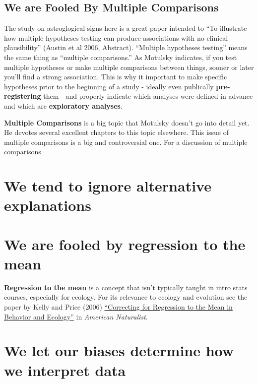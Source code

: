 \documentclass[]{book}
\theoremstyle{definition}
\theoremstyle{definition}
\theoremstyle{definition}
\theoremstyle{remark}
\begin{document}
\subsection{We are Fooled By Multiple
Comparisons}\label{we-are-fooled-by-multiple-comparisons}

The study on astroglogical signs here is a great paper intended to ``To
illustrate how multiple hypotheses testing can produce associations with
no clinical plausibility'' (Austin et al 2006, Abstract). ``Multiple
hypotheses testing'' means the same thing as ``multiple comparisons.''
As Motulsky indicates, if you test multiple hypotheses or make multiple
comparisons between things, sooner or later you'll find a strong
association. This is why it important to make specific hypotheses prior
to the beginning of a study - ideally even publically
\textbf{pre-registering} them - and properly indicate which analyses
were defined in advance and which are \textbf{exploratory analyses}.

\textbf{Multiple Comparisons} is a big topic that Motulsky doesn't go
into detail yet. He devotes several excellent chapters to this topic
elsewhere. This issue of multiple comparisons is a big and controversial
one. For a discussion of multiple comparisons

\section{We tend to ignore alternative
explanations}\label{we-tend-to-ignore-alternative-explanations}

\section{We are fooled by regression to the
mean}\label{we-are-fooled-by-regression-to-the-mean}

\textbf{Regression to the mean} is a concept that isn't typically taught
in intro stats courses, especially for ecology. For its relevance to
ecology and evolution see the paper by Kelly and Price (2006)
\href{https://www.journals.uchicago.edu/doi/abs/10.1086/497402}{``Correcting
for Regression to the Mean in Behavior and Ecology''} in \emph{American
Naturalist}.

\section{We let our biases determine how we interpret
data}\label{we-let-our-biases-determine-how-we-interpret-data}
\end{document}
